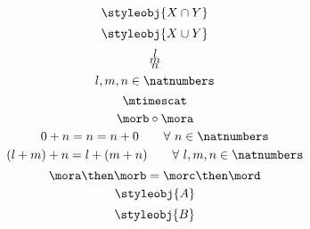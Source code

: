 {\begin{forslides}
\begin{equation}
            \label{eq:36}
            \styleobj{X \cap Y}
        \end{equation}
        \begin{equation}
            \label{eq:37}
            \styleobj{X \cup Y}
        \end{equation}
        \begin{equation}
            \label{eq:38}
            l
        \end{equation}
        \begin{equation}
            \label{eq:39}
            m
        \end{equation}
        \begin{equation}
            \label{eq:40}
            n
        \end{equation}
        \begin{equation}
            \label{eq:41}
            l, m, n \in \natnumbers
        \end{equation}
        \begin{equation}
            \label{eq:42}
            \mtimescat
        \end{equation}
        \begin{equation}
            \label{eq:43}
            \morb \circ \mora
        \end{equation}
        \begin{equation}
            \label{eq:44}
            0 + n = n = n + 0   \quad \quad \forall \ n \in \natnumbers
        \end{equation}
        \begin{equation}
            \label{eq:45}
            (l + m) + n = l + (m + n) \quad \quad  \forall \ l, m, n \in \natnumbers
        \end{equation}
        \begin{equation}
            \label{eq:46}
            \mora \then \morb = \morc \then \mord
        \end{equation}
        \begin{equation}
            \label{eq:47}
            \styleobj{A}
        \end{equation}
        \begin{equation}
            \label{eq:48}
            \styleobj{B}
        \end{equation}
        \begin{equation}
            \label{eq:49}

\end{equation}
\end{forslides}}
